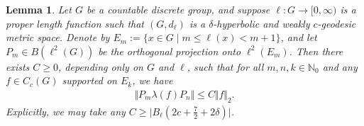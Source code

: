 \documentclass[10pt,a4paper]{amsart}
\newtheorem{lemma}{Lemma}
\newcommand{\N}{\mathbb{N}}
\begin{document}
\begin{lemma}\label{lemma:annular-norm-control}
   Let $G$ be a 
   countable discrete
   group, and suppose $\ell \colon G \to [0,\infty)$ is a proper length function such that $(G,d_\ell)$ is a $\delta$-hyperbolic and weakly $c$-geodesic metric space. 
   Denote by $E_m := \{x \in G \mid m \leq \ell(x) < m+1 \}$, 
   and let 
   $P_m \in B(\ell^2(G))$ be the orthogonal projection onto $\ell^2(E_m)$. 
   Then there exists $C \geq 0$, depending only on $G$ and $\ell$, such that for all $m,n,k \in \N_0$ and any $f \in C_c(G)$ supported on $E_k$, we have
   \begin{align*}
       \Vert P_m \lambda(f) P_n \Vert \leq C \Vert f \Vert_2. 
   \end{align*}
   Explicitly, we may take any $C \geq |B_\ell(2c + \frac{7}{2}+2\delta)\vert$. 
\end{lemma}
\end{document}
